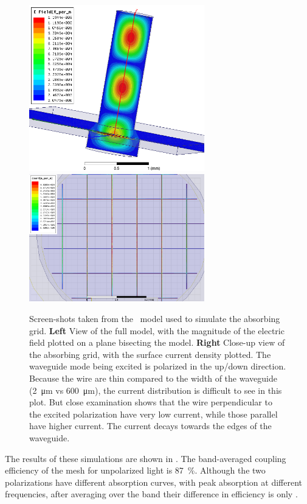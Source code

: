 \begin{figure}
\centering
\includegraphics[width=3in]{images/ch4-hfss-model.png}
\includegraphics[width=3in]{images/ch4-hfss-grid.png}
\caption[\HFSS model]{
  Screen-shots taken from the \HFSS\ model used to simulate the absorbing grid.
  \textbf{Left}
  View of the full model, with the magnitude of the electric field plotted on a plane bisecting the model.
  \textbf{Right}
  Close-up view of the absorbing grid, with the surface current density plotted.
  The waveguide mode being excited is polarized in the up/down direction.
  Because the wire are thin compared to the width of the waveguide (\SI{2}{\um} vs \SI{600}{\um}), the current distribution is difficult to see in this plot.
  But close examination shows that the wire perpendicular to the excited polarization have very low current, while those parallel have higher current.
  The current decays towards the edges of the waveguide.
}
\label{fig:ch4-hfss-model}
\end{figure}

The results of these simulations are shown in .
The band-averaged coupling efficiency of the mesh for unpolarized light is \SI{87}{\percent}.
Although the two polarizations have different absorption curves, with peak absorption at different frequencies, after averaging over the band their difference in efficiency is only .

